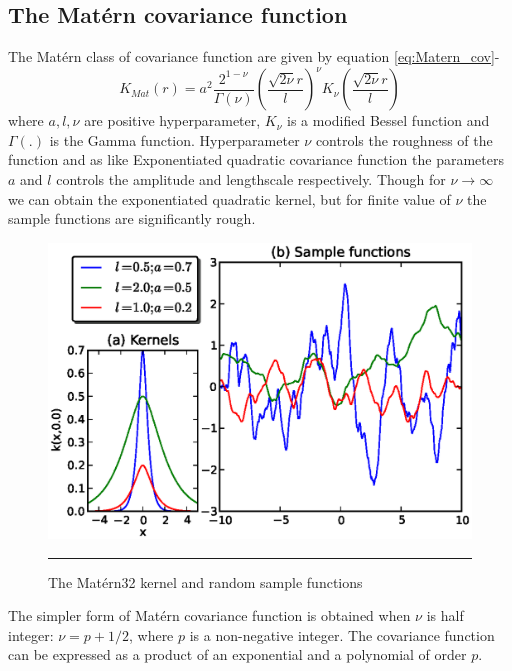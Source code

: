 \subsection{The Mat{\'e}rn covariance function}
The Mat{\'e}rn class of covariance function are given by equation \ref{eq:Matern_cov}-
\begin{equation} \label{eq:Matern_cov}
K_{Mat}(r)= a^2\frac{2^{1-\nu}}{\Gamma(\nu)}\left(\frac{\sqrt{2\nu}r}{l}\right)^\nu K_{\nu}
	  \left(\frac{\sqrt{2\nu}r}{l}\right)
\end{equation}
where $a, l, \nu$ are positive hyperparameter, $K_{\nu}$ is a modified Bessel function and
$\Gamma \left(.\right)$ is the Gamma function. Hyperparameter $\nu$ controls the roughness 
of the function and as like Exponentiated quadratic covariance function the parameters
$a$ and $l$ controls the amplitude and lengthscale respectively. Though for $\nu \to \infty$
we can obtain the exponentiated quadratic kernel, but for finite value of $\nu$ the sample 
functions are significantly rough. 
\begin{figure}[htbp]
	\centering
		\includegraphics[width=14cm,keepaspectratio]{diagrams/Mat32_cov.eps}
		\rule{35em}{0.5pt}
	\caption[The Mat{\'e}rn32 kernel and random sample functions]
		{The Mat{\'e}rn32 kernel and random sample functions}
	\label{fig:Matern32_covariance}
\end{figure}
The simpler form of Mat{\'e}rn covariance function is obtained when $\nu$ is half integer:
$\nu = p+1/2$, where $p$ is a non-negative integer. The covariance function can be expressed 
as a product of an exponential and a polynomial of order $p$. \cite{Abramowitz:1965} 
